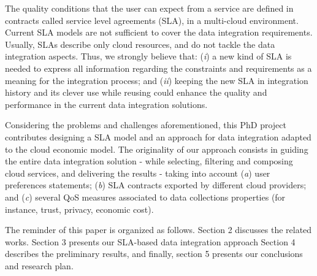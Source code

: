 The quality conditions that the user can expect from a service are defined in
contracts called service level agreements (SLA), in a multi-cloud environment.
%
Current SLA models are not sufficient to cover the data integration requirements. 
%
Usually, SLAs describe only cloud resources, and do not tackle the data integration aspects. 
%
Thus, we strongly believe that: 
(\textit{i}) a new kind of SLA is needed to express all information regarding the constraints and requirements as a meaning for the integration process; and 
(\textit{ii}) keeping the new SLA in integration history and its clever use while reusing could enhance the quality and performance in the current data integration solutions. 

Considering the problems and challenges aforementioned, this PhD project
contributes designing a SLA model and an approach for data integration adapted
to the cloud economic model. The originality of our approach consists in guiding
the entire data integration solution - while selecting, filtering and composing
cloud services, and delivering the results - taking into account (\textit{a})
user preferences statements; (\textit{b}) SLA contracts exported by different
cloud providers; and (\textit{c}) several QoS measures associated to data
collections properties (for instance, trust, privacy, economic cost).    

The reminder of this paper is organized as follows.
Section 2 discusses the related works.
Section 3 presents our SLA-based data integration approach
Section 4 describes the preliminary results, and finally, section 5 presents
our conclusions and research plan.
